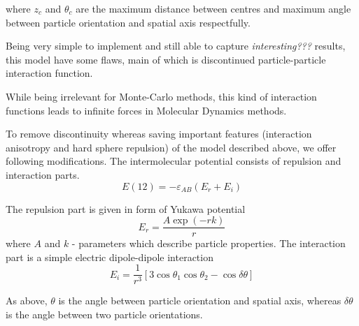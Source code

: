 \documentclass[12pt,a4paper]{article}
\begin{document}
where $z_c$ and $\theta_c$ are the maximum distance between centres and maximum angle between particle orientation and spatial axis respectfully.

Being very simple to implement and still able to capture \emph{interesting???} results, this model have some flaws, main of which is discontinued particle-particle interaction function.

While being irrelevant for Monte-Carlo methods, this kind of interaction functions leads to infinite forces in Molecular Dynamics methods.

To remove discontinuity whereas saving important features (interaction anisotropy and hard sphere repulsion) of the model described above, we offer following modifications.
The intermolecular potential consists of repulsion and interaction parts.
\begin{equation}
E(12) = - \varepsilon_{AB} (E_{r} + E_{i})
\end{equation}

The repulsion part is given in form of Yukawa potential
\begin{equation}
E_{r} = \frac{A \exp(-r k)}{r}
\end{equation}
where $A$ and $k$ - parameters which describe particle properties. The interaction part is a simple electric dipole-dipole interaction
\begin{equation}
E_{i} = \frac{1}{r^3} [3 \cos \theta_1 \cos \theta_2 - \cos \delta \theta]
\end{equation}

As above, $\theta$ is the angle between particle orientation and spatial axis, whereas $\delta \theta$ is the angle between two particle orientations.



\end{document}
